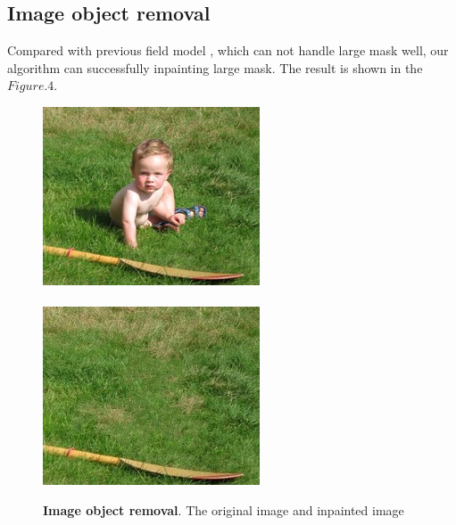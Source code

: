 \subsection*{Image object removal}
Compared with previous field model \etal\cite{cvpr10mrf, ijcv09}, which can not handle large mask well, our algorithm can successfully inpainting large mask. The result is shown in the $Figure.4$. 
\begin{figure}
	\centering
	\includegraphics[width=0.9\linewidth]{kid.jpg}\\\ \\
	\includegraphics[width=0.9\linewidth]{kid_result.jpg}
	\caption{\textbf{Image object removal}. The original image and inpainted image}
\end{figure}

